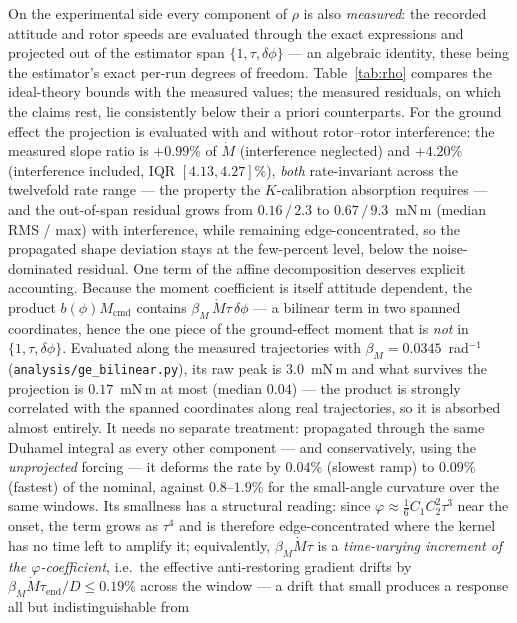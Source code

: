 On the experimental side every component of $\rho$ is also
\emph{measured}: the recorded attitude and rotor speeds are evaluated
through the exact expressions and projected out of the estimator span
$\{1,\tau,\delta\phi\}$ — an algebraic identity, these being the
estimator's exact per-run degrees of freedom. Table~\ref{tab:rho}
compares the ideal-theory bounds with the measured values; the
measured residuals, on which the claims rest, lie consistently below
their a priori counterparts. For the ground effect the projection is
evaluated with and without rotor--rotor interference: the measured
slope ratio is $+0.99\%$ of $\dot M$ (interference neglected) and
$+4.20\%$ (interference included, IQR $[4.13, 4.27]\%$), \emph{both}
rate-invariant across the twelvefold rate range — the property the
$K$-calibration absorption requires — and the out-of-span residual
grows from $0.16\,/\,2.3$ to $0.67\,/\,9.3$~mN\,m (median RMS /
max) with interference, while remaining edge-concentrated, so the
propagated shape deviation stays at the few-percent level, below the
noise-dominated residual. One term of the affine decomposition deserves explicit accounting.
Because the moment coefficient is itself attitude dependent, the
product $b(\phi) M_{\mathrm{cmd}}$ contains
$\beta_M\,\dot M\tau\,\delta\phi$ — a bilinear term in two spanned
coordinates, hence the one piece of the ground-effect moment that is
\emph{not} in $\{1,\tau,\delta\phi\}$. Evaluated along the measured
trajectories with $\beta_M = 0.0345$~rad$^{-1}$
(\texttt{analysis/ge\_bilinear.py}), its raw peak is $3.0$~mN\,m and
what survives the projection is $0.17$~mN\,m at most (median
$0.04$) — the product is strongly correlated with the spanned
coordinates along real trajectories, so it is absorbed almost
entirely. It needs no separate treatment: propagated through the same
Duhamel integral as every other component — and conservatively, using
the \emph{unprojected} forcing — it deforms the rate by $0.04\%$
(slowest ramp) to $0.09\%$ (fastest) of the nominal, against
$0.8$--$1.9\%$ for the small-angle curvature over the same windows.
Its smallness has a structural reading: since
$\varphi \approx \tfrac16 C_1 C_2^2\tau^3$ near the onset, the term
grows as $\tau^4$ and is therefore edge-concentrated where the kernel
has no time left to amplify it; equivalently, $\beta_M\dot M\tau$ is a
\emph{time-varying increment of the $\varphi$-coefficient}, i.e.\ the
effective anti-restoring gradient drifts by
$\beta_M\dot M\tau_{\mathrm{end}}/D \le 0.19\%$ across the window —
a drift that small produces a response all but indistinguishable from
